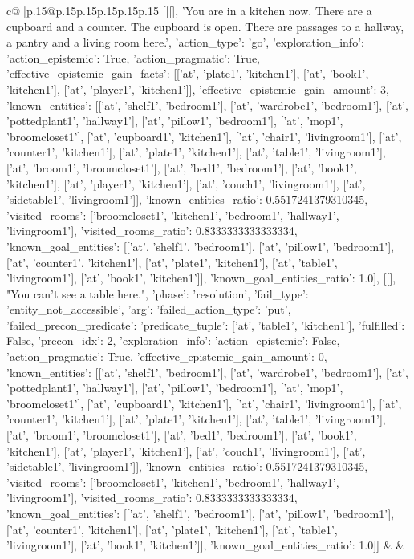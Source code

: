 \documentclass{article}
\begin{document}
{\begin{supertabular}{c@{$\;$}|p{.15\linewidth}@{}p{.15\linewidth}p{.15\linewidth}p{.15\linewidth}p{.15\linewidth}p{.15\linewidth}}
{{{	 [[[], 'You are in a kitchen now. There are a cupboard and a counter. The cupboard is open. There are passages to a hallway, a pantry and a living room here.', {'action_type': 'go', 'exploration_info': {'action_epistemic': True, 'action_pragmatic': True, 'effective_epistemic_gain_facts': [['at', 'plate1', 'kitchen1'], ['at', 'book1', 'kitchen1'], ['at', 'player1', 'kitchen1']], 'effective_epistemic_gain_amount': 3, 'known_entities': [['at', 'shelf1', 'bedroom1'], ['at', 'wardrobe1', 'bedroom1'], ['at', 'pottedplant1', 'hallway1'], ['at', 'pillow1', 'bedroom1'], ['at', 'mop1', 'broomcloset1'], ['at', 'cupboard1', 'kitchen1'], ['at', 'chair1', 'livingroom1'], ['at', 'counter1', 'kitchen1'], ['at', 'plate1', 'kitchen1'], ['at', 'table1', 'livingroom1'], ['at', 'broom1', 'broomcloset1'], ['at', 'bed1', 'bedroom1'], ['at', 'book1', 'kitchen1'], ['at', 'player1', 'kitchen1'], ['at', 'couch1', 'livingroom1'], ['at', 'sidetable1', 'livingroom1']], 'known_entities_ratio': 0.5517241379310345, 'visited_rooms': ['broomcloset1', 'kitchen1', 'bedroom1', 'hallway1', 'livingroom1'], 'visited_rooms_ratio': 0.8333333333333334, 'known_goal_entities': [['at', 'shelf1', 'bedroom1'], ['at', 'pillow1', 'bedroom1'], ['at', 'counter1', 'kitchen1'], ['at', 'plate1', 'kitchen1'], ['at', 'table1', 'livingroom1'], ['at', 'book1', 'kitchen1']], 'known_goal_entities_ratio': 1.0}}], [[], "You can't see a table here.", {'phase': 'resolution', 'fail_type': 'entity_not_accessible', 'arg': {'failed_action_type': 'put', 'failed_precon_predicate': {'predicate_tuple': ['at', 'table1', 'kitchen1'], 'fulfilled': False, 'precon_idx': 2}}, 'exploration_info': {'action_epistemic': False, 'action_pragmatic': True, 'effective_epistemic_gain_amount': 0, 'known_entities': [['at', 'shelf1', 'bedroom1'], ['at', 'wardrobe1', 'bedroom1'], ['at', 'pottedplant1', 'hallway1'], ['at', 'pillow1', 'bedroom1'], ['at', 'mop1', 'broomcloset1'], ['at', 'cupboard1', 'kitchen1'], ['at', 'chair1', 'livingroom1'], ['at', 'counter1', 'kitchen1'], ['at', 'plate1', 'kitchen1'], ['at', 'table1', 'livingroom1'], ['at', 'broom1', 'broomcloset1'], ['at', 'bed1', 'bedroom1'], ['at', 'book1', 'kitchen1'], ['at', 'player1', 'kitchen1'], ['at', 'couch1', 'livingroom1'], ['at', 'sidetable1', 'livingroom1']], 'known_entities_ratio': 0.5517241379310345, 'visited_rooms': ['broomcloset1', 'kitchen1', 'bedroom1', 'hallway1', 'livingroom1'], 'visited_rooms_ratio': 0.8333333333333334, 'known_goal_entities': [['at', 'shelf1', 'bedroom1'], ['at', 'pillow1', 'bedroom1'], ['at', 'counter1', 'kitchen1'], ['at', 'plate1', 'kitchen1'], ['at', 'table1', 'livingroom1'], ['at', 'book1', 'kitchen1']], 'known_goal_entities_ratio': 1.0}}]] 
	  } 
	   } 
	   } 
	 & & \\ 
 


\end{supertabular}}
\end{document}
